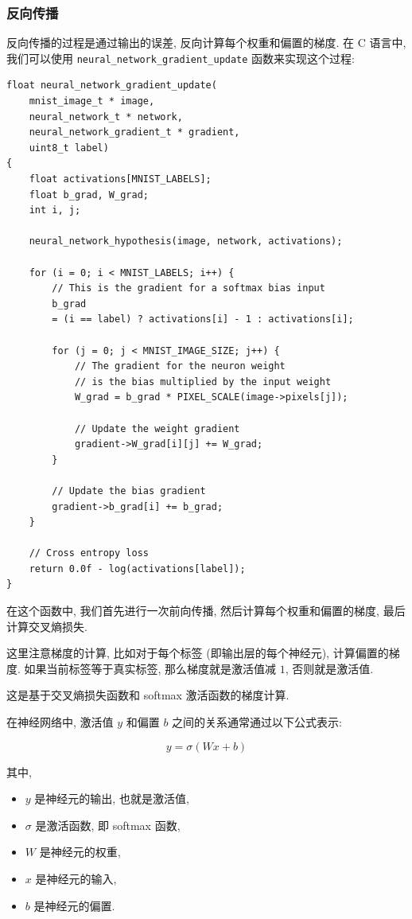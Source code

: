 \documentclass{ctexart}
\begin{document}
\subsubsection{反向传播}

反向传播的过程是通过输出的误差, 反向计算每个权重和偏置的梯度. 在 C 语言中, 我们可以使用 \verb|neural_network_gradient_update| 函数来实现这个过程:

\begin{verbatim}  
float neural_network_gradient_update(
    mnist_image_t * image, 
    neural_network_t * network, 
    neural_network_gradient_t * gradient, 
    uint8_t label)  
{  
    float activations[MNIST_LABELS];  
    float b_grad, W_grad;  
    int i, j;  
  
    neural_network_hypothesis(image, network, activations);  
  
    for (i = 0; i < MNIST_LABELS; i++) {  
        // This is the gradient for a softmax bias input  
        b_grad 
        = (i == label) ? activations[i] - 1 : activations[i];  
  
        for (j = 0; j < MNIST_IMAGE_SIZE; j++) {  
            // The gradient for the neuron weight 
            // is the bias multiplied by the input weight  
            W_grad = b_grad * PIXEL_SCALE(image->pixels[j]);  
  
            // Update the weight gradient  
            gradient->W_grad[i][j] += W_grad;  
        }  
  
        // Update the bias gradient  
        gradient->b_grad[i] += b_grad;  
    }  
  
    // Cross entropy loss  
    return 0.0f - log(activations[label]);  
}  
\end{verbatim}

在这个函数中, 我们首先进行一次前向传播, 然后计算每个权重和偏置的梯度, 最后计算交叉熵损失.

这里注意梯度的计算, 比如对于每个标签 (即输出层的每个神经元), 计算偏置的梯度. 如果当前标签等于真实标签, 那么梯度就是激活值减 $1$,
否则就是激活值.

这是基于交叉熵损失函数和 softmax 激活函数的梯度计算.

在神经网络中, 激活值 $y$ 和偏置 $b$ 之间的关系通常通过以下公式表示:

$$
    y = \sigma(Wx + b)
$$

其中,
\begin{itemize}
    \item $y$ 是神经元的输出, 也就是激活值,
    \item $\sigma$ 是激活函数, 即 softmax 函数,
    \item $W$ 是神经元的权重,
    \item $x$ 是神经元的输入,
    \item $b$ 是神经元的偏置.
\end{itemize}
\end{document}
